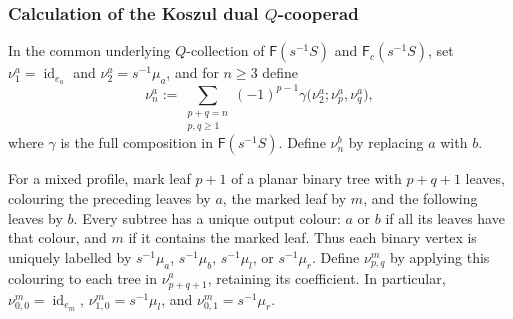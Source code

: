 \documentclass[11pt,letterpaper]{article}
\numberwithin{equation}{section}
\theoremstyle{plain}
\theoremstyle{definition}
\theoremstyle{remark}
\newcommand{\id}{\operatorname{id}}
\newcommand{\p}{\mathfrak p}
\begin{document}
\subsubsection{Calculation of the Koszul dual $Q$-cooperad}
\label{sss_calculate_koszul_dual_case_module}
In the common underlying $Q$-collection of $\mathsf F(s^{-1}S)$ and
$\mathsf F_c(s^{-1}S)$, set $\nu_1^a=\id_{e_a}$ and
$\nu_2^a=s^{-1}\mu_a$, and for $n\ge3$ define
\begin{equation}
\label{eq_inductive_nu_a}
\nu_n^a
:=
\sum_{\substack{p+q=n\\p,q\geq1}}
(-1)^{p-1}
\gamma
\bigl(
\nu_2^a;
\nu_p^a,\nu_q^a
\bigr),
\end{equation}
where $\gamma$ is the full composition in $\mathsf F(s^{-1}S)$.
Define $\nu_n^b$ by replacing $a$ with $b$.

For a mixed profile, mark leaf $p+1$ of a planar binary tree with
$p+q+1$ leaves, colouring the preceding leaves by $a$, the marked
leaf by $m$, and the following leaves by $b$. Every subtree has a
unique output colour: $a$ or $b$ if all its leaves have that colour,
and $m$ if it contains the marked leaf. Thus each binary vertex is
uniquely labelled by $s^{-1}\mu_a$, $s^{-1}\mu_b$,
$s^{-1}\mu_l$, or $s^{-1}\mu_r$.
Define $\nu_{p,q}^m$ by applying this colouring to each tree in
$\nu_{p+q+1}^a$, retaining its coefficient. In particular,
$\nu_{0,0}^m=\id_{e_m}$, $\nu_{1,0}^m=s^{-1}\mu_l$, and
$\nu_{0,1}^m=s^{-1}\mu_r$.
\end{document}
